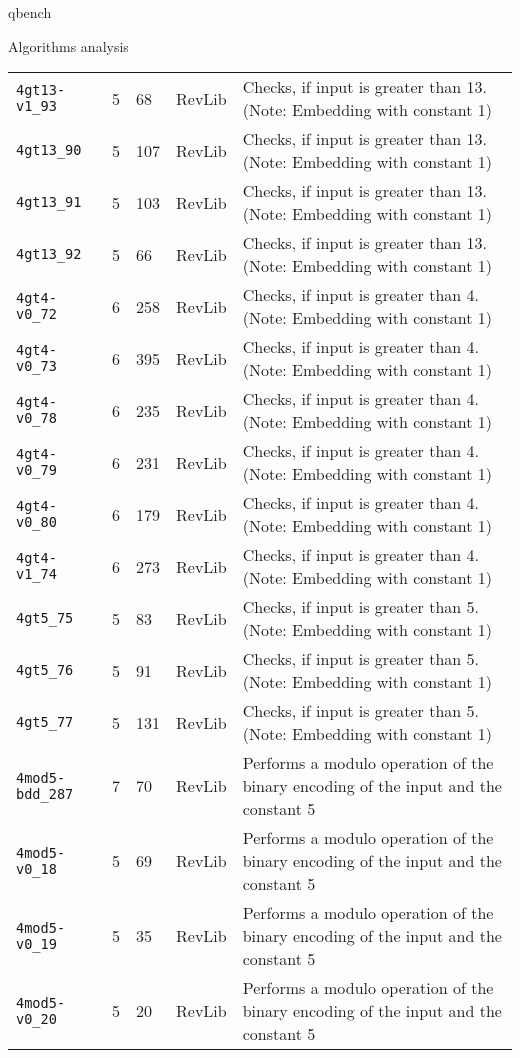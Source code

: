 \documentclass[11pt]{beamer}
\begin{document}
\begin{frame}[fragile,label={sec:org639c711}]{qbench}
\begin{block}{Algorithms analysis}
\begin{table}[htbp]
\begin{tabular}{|p{3cm}|p{1.5cm}|p{1cm}|p{1cm}|p{7.5cm}|}
\texttt{4gt13-v1\_93} & 5 & 68 & RevLib & Checks, if input is greater than 13. (Note: Embedding with constant 1)\\
\texttt{4gt13\_90} & 5 & 107 & RevLib & Checks, if input is greater than 13. (Note: Embedding with constant 1)\\
\texttt{4gt13\_91} & 5 & 103 & RevLib & Checks, if input is greater than 13. (Note: Embedding with constant 1)\\
\texttt{4gt13\_92} & 5 & 66 & RevLib & Checks, if input is greater than 13. (Note: Embedding with constant 1)\\
\texttt{4gt4-v0\_72} & 6 & 258 & RevLib & Checks, if input is greater than 4. (Note: Embedding with constant 1)\\
\texttt{4gt4-v0\_73} & 6 & 395 & RevLib & Checks, if input is greater than 4. (Note: Embedding with constant 1)\\
\texttt{4gt4-v0\_78} & 6 & 235 & RevLib & Checks, if input is greater than 4. (Note: Embedding with constant 1)\\
\texttt{4gt4-v0\_79} & 6 & 231 & RevLib & Checks, if input is greater than 4. (Note: Embedding with constant 1)\\
\texttt{4gt4-v0\_80} & 6 & 179 & RevLib & Checks, if input is greater than 4. (Note: Embedding with constant 1)\\
\texttt{4gt4-v1\_74} & 6 & 273 & RevLib & Checks, if input is greater than 4. (Note: Embedding with constant 1)\\
\texttt{4gt5\_75} & 5 & 83 & RevLib & Checks, if input is greater than 5. (Note: Embedding with constant 1)\\
\texttt{4gt5\_76} & 5 & 91 & RevLib & Checks, if input is greater than 5. (Note: Embedding with constant 1)\\
\texttt{4gt5\_77} & 5 & 131 & RevLib & Checks, if input is greater than 5. (Note: Embedding with constant 1)\\
\texttt{4mod5-bdd\_287} & 7 & 70 & RevLib & Performs a modulo operation of the binary encoding of the input and the constant 5\\
\texttt{4mod5-v0\_18} & 5 & 69 & RevLib & Performs a modulo operation of the binary encoding of the input and the constant 5\\
\texttt{4mod5-v0\_19} & 5 & 35 & RevLib & Performs a modulo operation of the binary encoding of the input and the constant 5\\
\texttt{4mod5-v0\_20} & 5 & 20 & RevLib & Performs a modulo operation of the binary encoding of the input and the constant 5\\

\end{tabular}
\end{table}
\end{block}
\end{frame}
\end{document}
